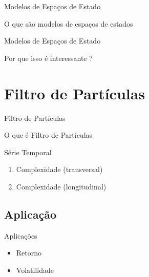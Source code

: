 \documentclass{beamer}
\begin{document}
\begin{frame}{Modelos de Espaços de Estado}

O que são modelos de espaços de estados

\end{frame}


\begin{frame}{Modelos de Espaços de Estado}

Por que isso é interessante ?

\end{frame}



\section{Filtro de Partículas}



\begin{frame}{Filtro de Partículas}

O que é Filtro de Partículas

\end{frame}



\begin{frame}{Série Temporal}


\begin{enumerate}

\item Complexidade (transversal)

\item  Complexidade (longitudinal)

\end{enumerate}

\end{frame}

\subsection{Aplicação}


\begin{frame}{Aplicações}

\begin{itemize}

\item Retorno

\item Volatilidade
\end{itemize}

\end{frame}
\end{document}
